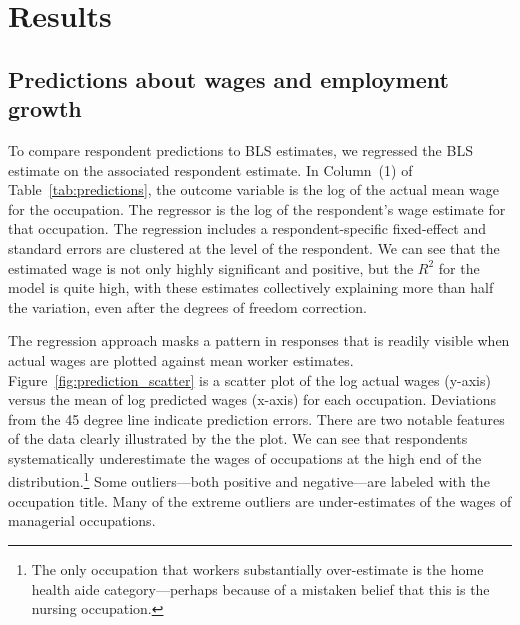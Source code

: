 \documentclass[12pt]{article}
\begin{document}
\section{Results}

\subsection{Predictions about wages and employment growth}

To compare respondent predictions to BLS estimates, we regressed the BLS estimate on the associated respondent estimate. 
In Column~(1) of Table~\ref{tab:predictions}, the outcome variable is the log of the actual mean wage for the occupation. 
The regressor is the log of the respondent's wage estimate for that occupation. 
The regression includes a respondent-specific fixed-effect and standard errors are clustered at the level of the respondent. 
We can see that the estimated wage is not only highly significant and positive, but the $R^2$ for the model is quite high, with these estimates collectively explaining more than half the variation, even after the degrees of freedom correction. 




The regression approach masks a pattern in responses that is readily visible when actual wages are plotted against mean worker estimates. 
Figure~\ref{fig:prediction_scatter} is a scatter plot of the log actual wages (y-axis) versus the mean of log predicted wages (x-axis) for each occupation. 
Deviations from the 45 degree line indicate prediction errors. 
There are two notable features of the data clearly illustrated by the the plot. 
We can see that respondents systematically underestimate the wages of occupations at the high end of the distribution.\footnote{The only occupation that workers substantially over-estimate is the home health aide category---perhaps because of a mistaken belief that this is the nursing occupation.}  
Some outliers---both positive and negative---are labeled with the occupation title.  
Many of the extreme outliers are under-estimates of the wages of managerial occupations. 
\end{document}
